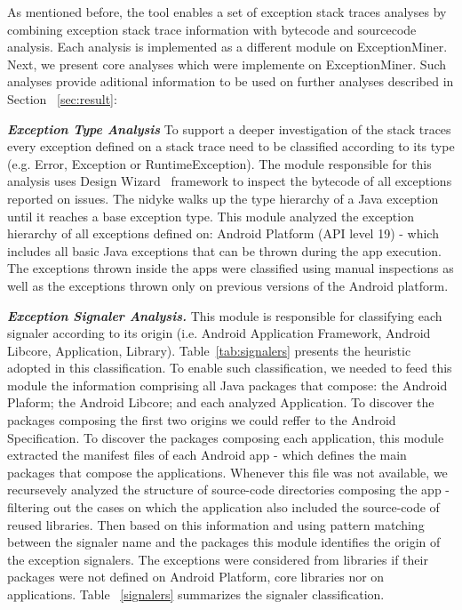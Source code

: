 \documentclass[conference]{IEEEtran}
\begin{document}
As mentioned before, the tool enables a set of exception stack traces analyses by combining exception stack 
trace information with bytecode and sourcecode analysis. Each analysis is implemented as a different module 
on ExceptionMiner. Next, we present core analyses which were implemente on ExceptionMiner. Such analyses 
provide aditional information to be used on further analyses described in Section ~\ref{sec:result}:

\emph{\textbf{Exception Type Analysis}} To support a deeper investigation of the 
stack traces every exception defined on a stack trace need to be classified according to its type
(e.g. Error, Exception or RuntimeException). The module responsible for this analysis 
uses Design Wizard~\cite{Brunet09} framework to inspect the bytecode of all exceptions reported on issues.
The nidyke walks up the type hierarchy of a Java exception until it reaches a base exception type.
This module analyzed the exception hierarchy of all exceptions defined on:
Android Platform (API level 19) - which includes all basic Java exceptions that 
can be thrown during the app execution. The exceptions thrown inside the apps
were classified using manual inspections as well as the exceptions thrown only
on previous versions of the Android platform.

\emph{\textbf{Exception Signaler Analysis.}}
This module is responsible for classifying each signaler according 
to its origin (i.e. Android Application Framework, Android Libcore, Application, Library). 
Table~\ref{tab:signalers} presents the heuristic adopted in this classification.
To enable such classification, we needed to feed this module the information
comprising all Java packages that compose: the Android Plaform;
 the Android Libcore; and each analyzed Application. 
To discover the packages composing the first two origins
we could reffer to the Android Specification.
To discover the packages composing each application, this module 
extracted the manifest files of each Android app
 - which defines the main packages that compose the applications.
 Whenever this file was not available, we recursevely analyzed the 
structure of source-code directories composing the app
- filtering out the cases on which the application 
also included the source-code of reused libraries.
Then based on this information and using pattern matching 
between the signaler name and the packages this module identifies 
the origin of the exception signalers. The exceptions were considered
 from libraries if their packages were not defined 
on Android Platform, core libraries nor on applications.
Table ~\ref{signalers} summarizes the signaler classification.
\end{document}
